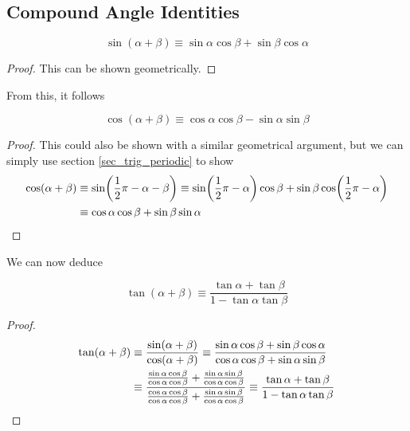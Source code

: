 \subsection{Compound Angle Identities} \label{sec_comp_angle}


\begin{theorem}
\begin{equation*}
\sin(\alpha + \beta) \equiv
   \sin \alpha \cos \beta +  \sin \beta \cos \alpha
\end{equation*}
\end{theorem}
\begin{proof}
This can be shown geometrically.
\end{proof}
From this, it follows
\begin{theorem}
\begin{equation*}
\cos(\alpha + \beta) \equiv
   \cos \alpha \cos \beta - \sin \alpha \sin \beta
\end{equation*}
\end{theorem}
\begin{proof}
This could also be shown with a similar geometrical argument, but we can
simply use section \ref{sec_trig_periodic} to show
\begin{align*}
\cos(\alpha + \beta) &\equiv
    \sin(\frac 12 \pi - \alpha - \beta) \equiv
    \sin(\frac 12 \pi - \alpha)\cos \beta +
        \sin \beta \cos(\frac 12 \pi - \alpha) \\
&\equiv
    \cos \alpha \cos \beta + \sin \beta \sin \alpha \qedhere
\end{align*}
\end{proof}
We can now deduce
\begin{theorem}
\begin{equation*}
\tan(\alpha + \beta) \equiv
    \frac{\tan \alpha + \tan \beta}{1 - \tan \alpha \tan \beta}
\end{equation*}
\end{theorem}
\begin{proof}
\begin{align*}
\tan(\alpha + \beta) &\equiv
    \frac{\sin(\alpha + \beta)}{\cos(\alpha + \beta)} \equiv
    \frac{\sin \alpha \cos \beta + \sin \beta \cos \alpha}
         {\cos \alpha \cos \beta + \sin \alpha \sin \beta} \\
    &\equiv \frac{
          \frac{\sin \alpha \cos \beta}{\cos \alpha \cos \beta} +
          \frac{\sin \alpha \sin \beta}{\cos \alpha \cos \beta}}
         {\frac{\cos \alpha \cos \beta}{\cos \alpha \cos \beta} +
          \frac{\sin \alpha \sin \beta}{\cos \alpha \cos \beta}}
         \equiv
    \frac{\tan \alpha + \tan \beta}{1 - \tan \alpha \tan \beta} \qedhere
\end{align*}
\end{proof}
